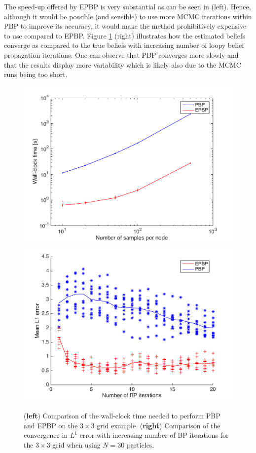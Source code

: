 The speed-up offered by EPBP is very substantial as can be seen in  (left). Hence, although it would be possible (and sensible) to use more MCMC iterations within PBP to improve its accuracy, it would make the method prohibitively expensive to use compared to EPBP. Figure \ref{compConv} (right) illustrates how the estimated beliefs converge as compared to the true beliefs with increasing number of loopy belief propagation iterations. One can observe that PBP converges more slowly and that the results display more variability which is likely also due to the MCMC runs being too short. %

%
%
%
%
%

%
\begin{figure}[!h]
\center
\includegraphics[width=.51\textwidth]{figures/epbp/timeComparison}
\hspace*{-.7cm}
\includegraphics[width=.51\textwidth]{figures/epbp/compBPconv}
%
\caption{\label{compConv} (\textbf{left}) Comparison of the wall-clock time needed to perform PBP and EPBP on the $3\times 3$ grid example. (\textbf{right}) Comparison of the convergence in $L^{1}$ error with increasing number of BP iterations for the $3\times 3$ grid when using $N=30$ particles. }%
\end{figure}
